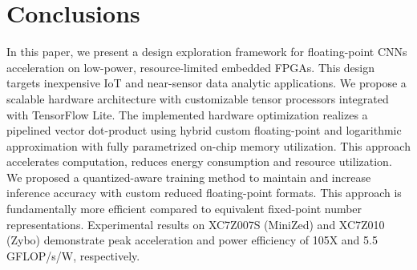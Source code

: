 \section{Conclusions}
\label{sec:conclusions}
In this paper, we present a design exploration framework for floating-point CNNs acceleration on low-power, resource-limited embedded FPGAs. This design targets inexpensive IoT and near-sensor data analytic applications. We propose a scalable hardware architecture with customizable tensor processors integrated with TensorFlow Lite. The implemented hardware optimization realizes a pipelined vector dot-product using hybrid custom floating-point and logarithmic approximation with fully parametrized on-chip memory utilization. This approach accelerates computation, reduces energy consumption and resource utilization. We proposed a quantized-aware training method to maintain and increase inference accuracy with custom reduced floating-point formats. This approach is fundamentally more efficient compared to equivalent fixed-point number representations. Experimental results on XC7Z007S (MiniZed) and XC7Z010 (Zybo) demonstrate peak acceleration and power efficiency of 105X and 5.5 GFLOP/s/W, respectively.
